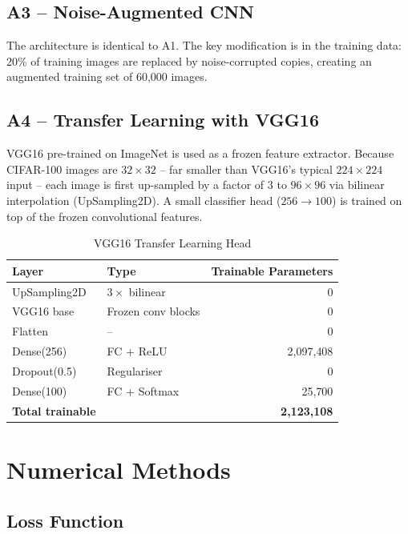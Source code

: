 \documentclass[12pt,a4paper]{article}
\begin{document}
\subsection{A3 -- Noise-Augmented CNN}

The architecture is identical to A1. The key modification is in the training data: 20\% of training images are replaced by noise-corrupted copies, creating an augmented training set of 60{,}000 images.

\subsection{A4 -- Transfer Learning with VGG16}

VGG16 pre-trained on ImageNet is used as a frozen feature extractor. Because CIFAR-100 images are $32\times32$ -- far smaller than VGG16's typical $224\times224$ input -- each image is first up-sampled by a factor of $3$ to $96\times96$ via bilinear interpolation (UpSampling2D). A small classifier head ($256 \to 100$) is trained on top of the frozen convolutional features.

\begin{table}[H]
\centering
\caption{VGG16 Transfer Learning Head}
\begin{tabular}{llr}
\toprule
\textbf{Layer} & \textbf{Type} & \textbf{Trainable Parameters} \\
\midrule
UpSampling2D   & $3\times$ bilinear & 0 \\
VGG16 base     & Frozen conv blocks & 0 \\
Flatten        & --            & 0 \\
Dense(256)     & FC + ReLU     & 2{,}097{,}408 \\
Dropout(0.5)   & Regulariser   & 0 \\
Dense(100)     & FC + Softmax  & 25{,}700 \\
\midrule
\textbf{Total trainable} & & \textbf{2{,}123{,}108} \\
\bottomrule
\end{tabular}
\end{table}

\section{Numerical Methods}

\subsection{Loss Function}
\end{document}
